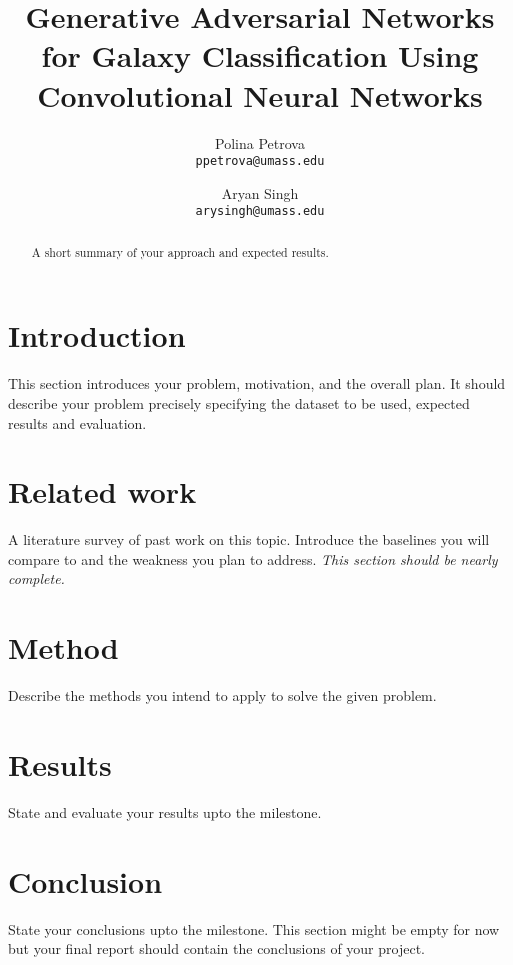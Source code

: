 \documentclass[10pt,twocolumn,letterpaper]{article}
\title{Generative Adversarial Networks for Galaxy Classification Using Convolutional
Neural Networks}
\author{Polina Petrova\\
{\tt\small ppetrova@umass.edu}
\and
Aryan Singh\\
{\tt\small arysingh@umass.edu}
}
\begin{document}
\maketitle
\begin{abstract}
A short summary of your approach and expected results.
\end{abstract}

\section{Introduction}
This section introduces your problem, motivation, and the overall plan. It should describe your problem precisely specifying the dataset to be used, expected results and evaluation.

\section{Related work}
A literature survey of past work on this topic. Introduce the baselines you will compare to and the weakness you plan to address. \emph{This section should be nearly complete.}

\section{Method}
Describe the methods you intend to apply to solve the given problem.

\section{Results}
State and evaluate your results upto the milestone.

\section{Conclusion}
State your conclusions upto the milestone. This section might be empty for now but your final report should contain the conclusions of your project.
{
    \small
    
    
}
\end{document}
